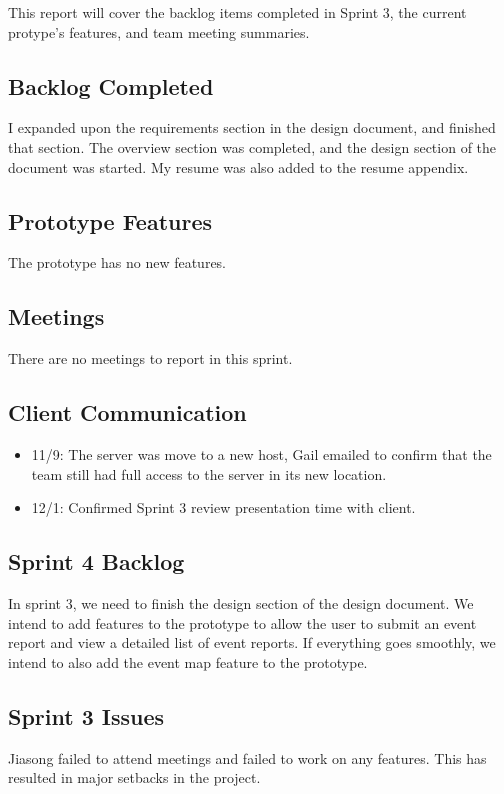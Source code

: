 
This report will cover the backlog items completed in Sprint 3, the current protype's features, and team meeting summaries. 

 \subsection{Backlog Completed}
 I expanded upon the requirements section in the design document, and finished that section. The overview section was completed, and the design section of the document was started. My resume was also added to the resume appendix.
 
 \subsection{Prototype Features}
 The prototype has no new features.
 
 \subsection{Meetings}
There are no meetings to report in this sprint.

\subsection{Client Communication}
\begin{itemize}
\item11/9: The server was move to a new host, Gail emailed to confirm that the team still had full access to the server in its new location.
\item12/1: Confirmed Sprint 3 review presentation time with client.
\end{itemize}

\subsection{Sprint 4 Backlog}
In sprint 3, we need to finish the design section of the design document. We intend to add features to the prototype to allow the user to submit an event report and view a detailed list of event reports. If everything goes smoothly, we intend to also add the event map feature to the prototype.

\subsection{Sprint 3 Issues}
Jiasong failed to attend meetings and failed to work on any features. This has resulted in major setbacks in the project.
